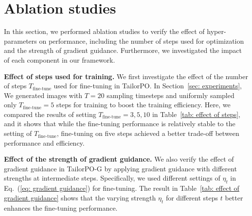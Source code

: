 \section{Ablation studies}
\label{sec: app_ablation}
In this section, we performed ablation studies to verify the effect of hyper-parameters on performance, including the number of steps used for optimization and the strength of gradient guidance.
Furthermore, we investigated the impact of each component in our framework.


\textbf{Effect of steps used for training.}
We first investigate the effect of the number of steps $T_\text{fine-tune}$ used for fine-tuning in TailorPO.
In Section~\ref{sec: experiments}, We generated images with $T=20$ sampling timesteps and uniformly sampled only $T_\text{fine-tune}=5$ steps for training to boost the training efficiency.
Here, we compared the results of setting $T_\text{fine-tune}=3,5,10$ in Table~\ref{tab: effect of steps}, and it shows that while the fine-tuning performance is relatively stable to the setting of $T_\text{fine-tune}$, fine-tuning on five steps achieved a better trade-off between performance and efficiency.


\textbf{Effect of the strength of gradient guidance.}
We also verify the effect of gradient guidance in TailorPO-G by applying gradient guidance with different strengths at intermediate steps.
Specifically, we used different settings of $\eta_t$ in Eq.~(\ref{eq: gradient guidance}) for fine-tuning.
The result in Table~\ref{tab: effect of gradient guidance} shows that the varying strength $\eta_t$ for different steps $t$ better enhances the fine-tuning performance.

